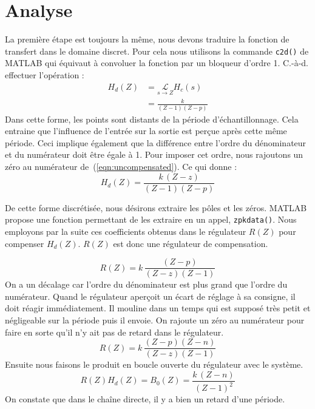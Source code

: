 \section{Analyse}
La première étape est toujours la même, nous devons traduire la fonction de transfert dans le domaine discret.
Pour cela nous utilisons la commande \texttt{c2d()} de MATLAB\textregistered{} qui équivaut à convoluer la fonction par un bloqueur d'ordre 1.
C.-à-d. effectuer l'opération :
\begin{align}
	H_d(Z) &= \underset{s\rightarrow Z}{\mathcal{L}} H_c(s) \\[2mm]
		   &= \frac{k}{(Z-1)(Z-p)}
		   \label{eqn:uncompensated}
\end{align}
Dans cette forme, les points sont distants de la période d'échantillonnage.
Cela entraine que l'influence de l'entrée sur la sortie est perçue après cette même période.
Ceci implique également que la différence entre l'ordre du dénominateur et du numérateur doit être égale à 1.
Pour imposer cet ordre, nous rajoutons un zéro au numérateur de~(\ref{eqn:uncompensated}).
Ce qui donne :
\begin{equation}
	H_d(Z) = \frac{k\,(Z-z)}{(Z-1)(Z-p)}
\end{equation}

De cette forme discrétisée, nous désirons extraire les pôles et les zéros.
MATLAB\textregistered{} propose une fonction permettant de les extraire en un appel, \texttt{zpkdata()}.
Nous employons par la suite ces coefficients obtenus dans le régulateur $R(Z)$ pour compenser $H_d(Z)$.
$R(Z)$ est donc une régulateur de compensation.

\begin{equation}
	R(Z) = k\,\frac{(Z-p)}{(Z-z)(Z-1)}
\end{equation}
On a un décalage car l'ordre du dénominateur est plus grand que l'ordre du numérateur.
Quand le régulateur aperçoit un écart de réglage à sa consigne, il doit réagir immédiatement.
Il \og{}mouline\fg{} dans un temps qui est supposé très petit et négligeable sur la période puis il envoie.
On rajoute un zéro au numérateur pour faire en sorte qu'il n'y ait pas de retard dans le régulateur.
\begin{equation}
	R(Z) = k\,\frac{(Z-p)(Z-n)}{(Z-z)(Z-1)}
\end{equation}
Ensuite nous faisons le produit en boucle ouverte du régulateur avec le système.
\begin{equation}
	R(Z)H_d(Z) = B_0(Z) = \frac{k\,(Z-n)}{(Z-1)^2}
\end{equation}
On constate que dans le chaîne directe, il y a bien un retard d'une période.

